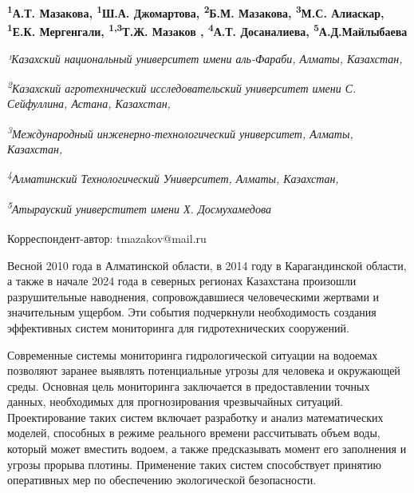 
\begin{articleheader}

{\bfseries
\textsuperscript{1}А.Т. Мазакова\authorid,
\textsuperscript{1}Ш.А. Джомартова\authorid,
\textsuperscript{2}Б.М. Мазакова\authorid,
\textsuperscript{3}М.С. Алиаскар\authorid,
\textsuperscript{1}Е.К. Мергенгали\authorid,
\textsuperscript{1,3}Т.Ж. Мазаков\textsuperscript{\envelope } \authorid,
\textsuperscript{4}А.Т. Досаналиева\authorid,
\textsuperscript{5}А.Д.Майлыбаева\authorid}
\end{articleheader}

\begin{affiliation}
\emph{¹Казахский национальный университет имени аль-Фараби, Алматы, Казахстан,}

\emph{\textsuperscript{2}Казахский агротехнический исследовательский университет имени С. Сейфуллина, Астана, Казахстан,}

\emph{\textsuperscript{3}Международный инженерно-технологический университет, Алматы, Казахстан,}

\emph{\textsuperscript{4}Алматинский Технологический Университет, Алматы, Казахстан,}

\emph{\textsuperscript{5}Атырауский универститет имени Х. Досмухамедова}

\raggedright \textsuperscript{\envelope }Корреспондент-автор: tmazakov@mail.ru
\end{affiliation}

Весной 2010 года в Алматинской области, в 2014 году в Карагандинской
области, а также в начале 2024 года в северных регионах Казахстана
произошли разрушительные наводнения, сопровождавшиеся человеческими
жертвами и значительным ущербом. Эти события подчеркнули необходимость
создания эффективных систем мониторинга для гидротехнических сооружений.

Современные системы мониторинга гидрологической ситуации на водоемах
позволяют заранее выявлять потенциальные угрозы для человека и
окружающей среды. Основная цель мониторинга заключается в предоставлении
точных данных, необходимых для прогнозирования чрезвычайных ситуаций.
Проектирование таких систем включает разработку и анализ математических
моделей, способных в режиме реального времени рассчитывать объем воды,
который может вместить водоем, а также предсказывать момент его
заполнения и угрозы прорыва плотины. Применение таких систем
способствует принятию оперативных мер по обеспечению экологической
безопасности.

